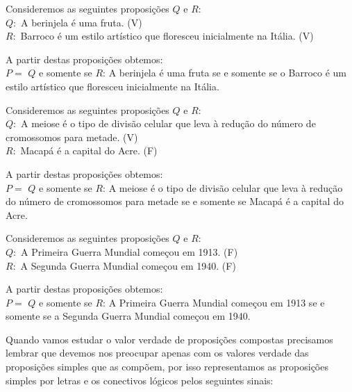 \begin{itemize}
 \begin{exem} \label{(Sse 1)}
 Consideremos as seguintes proposições $Q$ e $R$:\\
 $Q:$ A berinjela é uma fruta. (V) \\
 $R:$ Barroco é um estilo artístico que floresceu inicialmente na Itália. (V)

 A partir destas proposições obtemos:\\
 $P=$ $Q$ e somente se $R$: A berinjela é uma fruta se e somente se o Barroco é um estilo artístico que floresceu inicialmente na Itália.
 \end{exem}

 \begin{exem} \label{(Sse 2)}
 Consideremos as seguintes proposições $Q$ e $R$:\\
 $Q:$ A meiose é o tipo de divisão celular que leva à redução do número de cromossomos para metade. (V) \\
 $R:$ Macapá é a capital do Acre. (F)

 A partir destas proposições obtemos:\\
 $P=$ $Q$ e somente se $R$:  A meiose é o tipo de divisão celular que leva à redução do número de cromossomos para metade se e somente se Macapá é a capital do Acre.
 \end{exem}

 \begin{exem} \label{(Sse 3)}
 Consideremos as seguintes proposições $Q$ e $R$:\\
 $Q:$ A Primeira Guerra Mundial começou em 1913.  (F) \\
 $R:$ A Segunda Guerra Mundial começou em 1940. (F)

 A partir destas proposições obtemos:\\
 $P=$ $Q$ e somente se $R$:  A Primeira Guerra Mundial começou em 1913 se e somente se a Segunda Guerra Mundial começou em 1940.
 \end{exem}

 \end{itemize}

 Quando vamos estudar o valor verdade de proposições compostas precisamos lembrar que devemos nos preocupar apenas com os valores verdade das proposições simples que as compõem, por isso representamos as proposições simples por letras e os conectivos lógicos pelos seguintes sinais:

